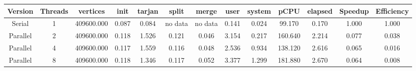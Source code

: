 \begin{tabular}{|c|c|c|c|c|c|c|c|c|c|c|c|c|}
\toprule
 Version &  Threads &   vertices &  init &  tarjan &   split &   merge &  user &  system &    pCPU &  elapsed &  Speedup &  Efficiency \\
\midrule
  Serial &        1 & 409600.000 & 0.087 &   0.084 & no data & no data & 0.141 &   0.024 &  99.170 &    0.170 &    1.000 &       1.000 \\
Parallel &        2 & 409600.000 & 0.118 &   1.526 &   0.121 &   0.046 & 3.154 &   0.217 & 160.640 &    2.214 &    0.077 &       0.038 \\
Parallel &        4 & 409600.000 & 0.117 &   1.559 &   0.116 &   0.048 & 2.536 &   0.934 & 138.120 &    2.616 &    0.065 &       0.016 \\
Parallel &        8 & 409600.000 & 0.118 &   1.346 &   0.117 &   0.052 & 3.377 &   1.299 & 181.880 &    2.670 &    0.064 &       0.008 \\
\bottomrule
\end{tabular}
